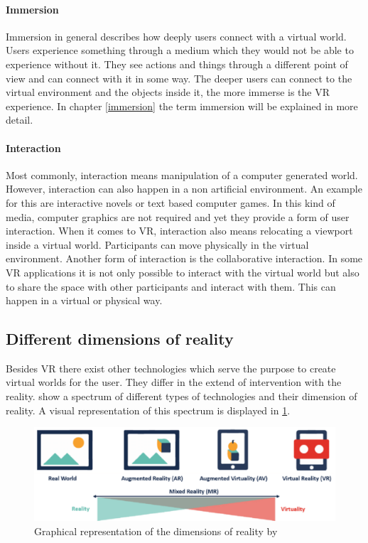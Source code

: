 \paragraph{Immersion} Immersion in general describes how deeply users connect with a virtual world. Users experience something through a medium which they would not be able to experience without it. They see actions and things through a different point of view and can connect with it in some way. The deeper users can connect to the virtual environment and the objects inside it, the more immerse is the VR experience. In chapter \ref{immersion} the term immersion will be explained in more detail.

\paragraph{Interaction} Most commonly, interaction means manipulation of a computer generated world. However, interaction can also happen in a non artificial environment. An example for this are interactive novels or text based computer games. In this kind of media, computer graphics are not required and yet they provide a form of user interaction. When it comes to VR, interaction also means relocating a viewport inside a virtual world. Participants can move physically in the virtual environment. Another form of interaction is the collaborative interaction. In some VR applications it is not only possible to interact with the virtual world but also to share the space with other participants and interact with them. This can happen in a virtual or physical way.
\subsection{Different dimensions of reality}
Besides VR there exist other technologies which serve the purpose to create virtual worlds for the user. They differ in the extend of intervention with the reality. \cite{Tham.2018} show a spectrum of different types of technologies and their dimension of reality. A visual representation of this spectrum is displayed in \ref{fig:spectrum}.\\
\begin{figure}[h!]
  \includegraphics[width=14cm]{kapitel/eps/spectrum-of-reality.pdf}
  \centering
  \caption{Graphical representation of the dimensions of reality by 	  \cite{Lovreglio.2018}}
  \label{fig:spectrum}
\end{figure}

